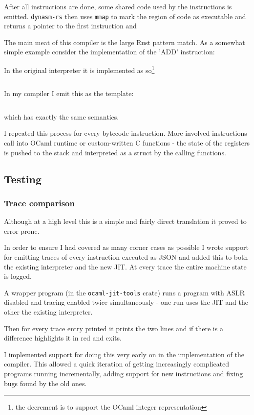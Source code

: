 After all instructions are done, some shared code used by the instructions is emitted.
\texttt{dynasm-rs} then uses
\texttt{mmap} to mark the region of code as executable and returns a pointer to the first
instruction and

The main meat of this compiler is the large Rust pattern match. As a somewhat simple example
consider the implementation of the 'ADD' instruction:

In the original interpreter it is implemented as so\footnote{the decrement is to support the OCaml
    integer representation}

\inputminted{c}{snippets/add.c}

In my compiler I emit this as the template:

\inputminted{rust}{snippets/add.rs}

which has exactly the same semantics.

I repeated this process for every bytecode instruction. More involved instructions call into
OCaml runtime or custom-written C functions - the state of the registers is pushed to the stack
and interpreted as a struct by the calling functions.

\subsection{Testing}

\subsubsection{Trace comparison}

Although at a high level this is a simple and fairly direct translation it proved to error-prone.

In order to ensure I had covered as many corner cases as possible I wrote support for emitting
traces of every instruction executed as JSON and added this to both the existing interpreter
and the new JIT. At every trace the entire machine state is logged.

A wrapper program (in the \texttt{ocaml-jit-tools} crate) runs a program with ASLR disabled and
tracing enabled twice
simultaneously - one run uses the JIT and the other the existing interpreter.

Then for every trace entry printed it prints the two lines and if there is a difference highlights
it in red and exits.

I implemented support for doing this very early on in the implementation of the compiler. This
allowed a quick iteration of getting increasingly complicated programs running incrementally,
adding support for new instructions and fixing bugs found by the old ones.

